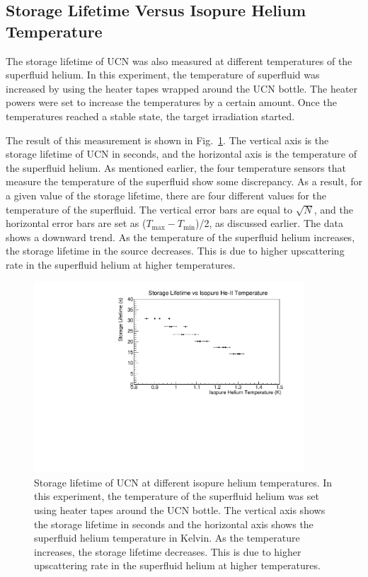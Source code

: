 \subsection{Storage Lifetime Versus Isopure Helium Temperature}
The storage lifetime of UCN was also measured at different
temperatures of the superfluid helium. In this experiment, the
temperature of superfluid was increased by using the heater tapes
wrapped around the UCN bottle. The heater powers were set to increase
the temperatures by a certain amount. Once the temperatures reached a
stable state, the target irradiation started.

The result of this measurement is shown in
Fig.~\ref{fig:storagelifetime_vs_temp}. The vertical axis is the
storage lifetime of UCN in seconds, and the horizontal axis is the
temperature of the superfluid helium. As mentioned earlier, the four
temperature sensors that measure the temperature of the superfluid
show some discrepancy. As a result, for a given value of the storage
lifetime, there are four different values for the temperature of the
superfluid. The vertical error bars are equal to $\sqrt{N}$, and the
horizontal error bars are set as
($T_{\mathrm{max}} - T_{\mathrm{min}}$)/2, as discussed earlier. The
data shows a downward trend. As the temperature of the superfluid
helium increases, the storage lifetime in the source decreases. This
is due to higher upscattering rate in the superfluid helium at
higher temperatures.


\begin{figure}[h!]
  \centering
  \includegraphics[width=0.9\textwidth]{StorageLifetime_vs_temp.pdf}
  \caption[UCN storage lifetime at different isopure helium
  temperatures]{Storage lifetime of UCN at different isopure helium
    temperatures. In this experiment, the temperature of the
    superfluid helium was set using heater tapes around the UCN
    bottle. The vertical axis shows the storage lifetime in seconds
    and the horizontal axis shows the superfluid helium temperature in
    Kelvin. As the temperature increases, the storage lifetime
    decreases. This is due to higher upscattering rate in the
    superfluid helium at higher temperatures.}
  \label{fig:storagelifetime_vs_temp}
\end{figure}



